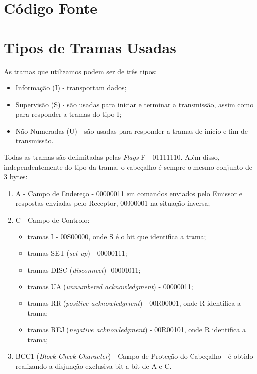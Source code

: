 \documentclass[11pt,a4paper,reqno]{report}
\numberwithin{equation}{section}
\begin{document}
\begin{appendices}

\chapter{Código Fonte}












\chapter{Tipos de Tramas Usadas}
\label{tramas}

As tramas que utilizamos podem ser de três tipos:
\begin{itemize}
	\item Informação (I) - transportam dados;
	\item Supervisão (S) - são usadas para iniciar e terminar a transmissão, assim como para responder a tramas do tipo I;
	\item Não Numeradas (U) - são usadas para responder a tramas de início e fim de transmissão.
\end{itemize}

Todas as tramas são delimitadas pelas \emph{Flags} F - 01111110. Além disso, independentemente do tipo da trama, o cabeçalho é sempre o mesmo conjunto de 3 bytes:
\begin{enumerate}
	\item A - Campo de Endereço - 00000011 em comandos enviados pelo Emissor e respostas enviadas pelo Receptor, 00000001 na situação inversa;
	\item C - Campo de Controlo:
		\begin{itemize}
			\item tramas I - 00S00000, onde S é o bit que identifica a trama;
			\item tramas SET (\emph{set up}) - 00000111;
			\item tramas DISC (\emph{disconnect})- 00001011;
			\item tramas UA (\emph{unnumbered acknowledgment}) - 00000011;
			\item tramas RR (\emph{positive acknowledgment}) - 00R00001, onde R identifica a trama;
			\item tramas REJ (\emph{negative acknowledgment}) - 00R00101, onde R identifica a trama;
		\end{itemize}
	\item BCC1 (\emph{Block Check Character}) - Campo de Proteção do Cabeçalho - é obtido realizando a disjunção exclusiva bit a bit de A e C.
\end{enumerate} 


\end{appendices}
\end{document}
